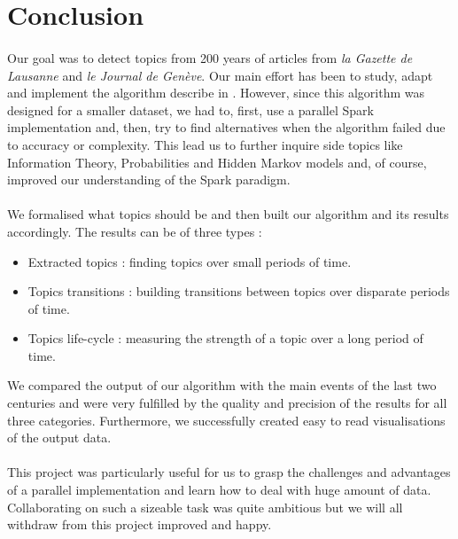 \section{Conclusion}

\paragraph{}
Our goal was to detect topics from 200 years of articles from \emph{la Gazette de Lausanne} and \emph{le Journal de Genève}. Our main effort has been to study, adapt and implement the algorithm describe in \cite{kdd05-ttm}. However, since this algorithm was designed for a smaller dataset, we had to, first, use a parallel Spark implementation and, then, try to find alternatives when the algorithm failed due to accuracy or complexity. This lead us to further inquire side topics like Information Theory, Probabilities and Hidden Markov models and, of course, improved our understanding of the Spark paradigm.

\paragraph{}
We formalised what topics should be and then built our algorithm and its results accordingly. The results can be of three types : 
\begin{itemize}
\item Extracted topics : finding topics over small periods of time.
\item Topics transitions : building transitions between topics over disparate periods of time.
\item Topics life-cycle : measuring the strength of a topic over a long period of time.
\end{itemize}
We compared the output of our algorithm with the main events of the last two centuries and were very fulfilled by the quality and precision of the results for all three categories. Furthermore, we successfully created easy to read visualisations of the output data.

\paragraph{}
This project was particularly useful for us to grasp the challenges and advantages of a parallel implementation and learn how to deal with huge amount of data. Collaborating on such a sizeable task was quite ambitious but we will all withdraw from this project improved and happy.